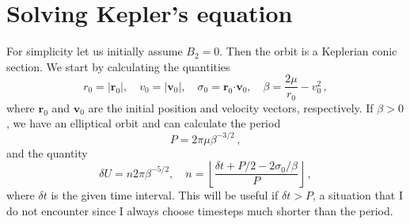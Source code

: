 \documentclass{article}
\begin{document}
\section{Solving Kepler's equation}
For simplicity let us initially assume $B_2=0$. Then the orbit is a Keplerian conic
section. We start by calculating the quantities
\begin{equation}
r_0 = |\mathbf{r}_0|, \quad
v_0 = |\mathbf{v}_0|, \quad
\sigma_0 = \mathbf{r}_0 \mathbf{\cdot} \mathbf{v}_0, \quad
\beta = \frac{2\mu}{r_0} - v_0^2\,,
\end{equation}
where $\mathbf{r}_0$ and $\mathbf{v}_0$ are the
initial position and velocity vectors, respectively. If $\beta>0$,
we have an elliptical orbit and can calculate the period
\begin{equation}
P = 2\pi\mu \beta^{-3/2}\,,
\end{equation}
and the quantity
\begin{equation}
\delta U = n2\pi\beta^{-5/2},\quad 
n = \left\lfloor\frac{\delta t + P/2 -2\sigma_0/\beta}{P}\right\rfloor\,,
\end{equation}
where $\delta t$ is the given time interval. This will be useful if
$\delta t > P$, a situation that I do not encounter since I always
choose timesteps much shorter than the period.
\end{document}
